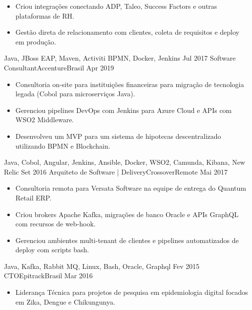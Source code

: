 \begin{experiences}
{\begin{itemize}
                        \item Criou integrações conectando ADP, Taleo, Success Factors e outras plataformas de RH.
                        \item Gestão direta de relacionamento com clientes, coleta de requisitos e deploy em produção.          
                      \end{itemize}
                    }
                    {Java, JBoss EAP, Maven, Activiti BPMN, Docker, Jenkins}
  \emptySeparator
  \experience
    {Jul 2017}     {Software Consultant}{Accenture}{Brasil}
    {Apr 2019}    {
                      \begin{itemize}
                        \item Consultoria on-site para instituições financeiras para migração de tecnologia legada (Cobol para microserviços Java).
                        \item Gerenciou pipelines DevOps com Jenkins para Azure Cloud e APIs com WSO2 Middleware.
                        \item Desenvolveu um MVP para um sistema de hipotecas descentralizado utilizando BPMN e Blockchain.
                      \end{itemize}
                    }
                    {Java, Cobol, Angular, Jenkins, Ansible, Docker, WSO2, Camunda, Kibana, New Relic}
  \emptySeparator
  \experience
    {Set 2016}     {Arquiteto de Software | Delivery}{Crossover}{Remote}
    {Mai 2017}    {
                      \begin{itemize}
                        \item Consultoria remota para Versata Software na equipe de entrega do Quantum Retail ERP.
                        \item Criou brokers Apache Kafka, migrações de banco Oracle e APIs GraphQL com recursos de web-hook.
                        \item Gerenciou ambientes multi-tenant de clientes e pipelines automatizados de deploy com scripts bash.
                      \end{itemize}
                    }
                    {Java, Kafka, Rabbit MQ, Linux, Bash, Oracle, Graphql}
  \emptySeparator
  \experience
    {Fev 2015}     {CTO}{Epitrack}{Brasil}
    {Mar 2016}    {
                      \begin{itemize}
                        \item Liderança Técnica para projetos de pesquisa em epidemiologia digital focados em Zika, Dengue e Chikungunya.

\end{itemize}}
\end{experiences}
